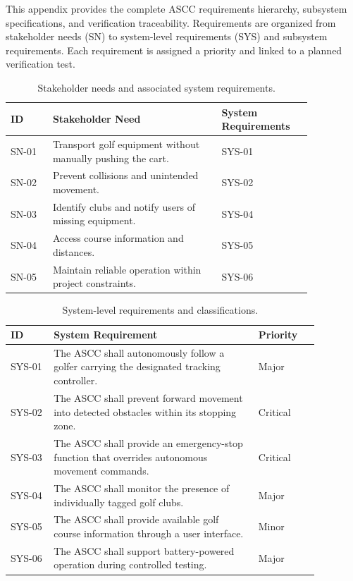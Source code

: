 
\label{app:requirements}

This appendix provides the complete ASCC requirements hierarchy, subsystem specifications, and verification traceability. Requirements are organized from stakeholder needs (SN) to system-level requirements (SYS) and subsystem requirements. Each requirement is assigned a priority and linked to a planned verification test.


\begin{table}[H]
\centering
\caption{Stakeholder needs and associated system requirements.}
\label{tab:app-stakeholder}
\footnotesize
\begin{tabular}{p{0.12\linewidth} p{0.48\linewidth} p{0.25\linewidth}}
\hline
\textbf{ID} & \textbf{Stakeholder Need} & \textbf{System Requirements} \\
\hline
SN-01 & Transport golf equipment without manually pushing the cart. & SYS-01 \\
SN-02 & Prevent collisions and unintended movement. & SYS-02\\
SN-03 & Identify clubs and notify users of missing equipment. & SYS-04 \\
SN-04 & Access course information and distances. & SYS-05 \\
SN-05 & Maintain reliable operation within project constraints. & SYS-06 \\
\hline
\end{tabular}
\end{table}

\begin{table}[H]
\centering
\caption{System-level requirements and classifications.}
\label{tab:app-system}
\footnotesize
\begin{tabular}{p{0.12\linewidth} p{0.58\linewidth} p{0.17\linewidth}}
\hline
\textbf{ID} & \textbf{System Requirement} & \textbf{Priority} \\
\hline
SYS-01 & The ASCC shall autonomously follow a golfer carrying the designated tracking controller. & Major \\
SYS-02 & The ASCC shall prevent forward movement into detected obstacles within its stopping zone. & Critical \\
SYS-03 & The ASCC shall provide an emergency-stop function that overrides autonomous movement commands. & Critical \\
SYS-04 & The ASCC shall monitor the presence of individually tagged golf clubs. & Major \\
SYS-05 & The ASCC shall provide available golf course information through a user interface. & Minor \\
SYS-06 & The ASCC shall support battery-powered operation during controlled testing. & Major \\
\hline
\end{tabular}
\end{table}

